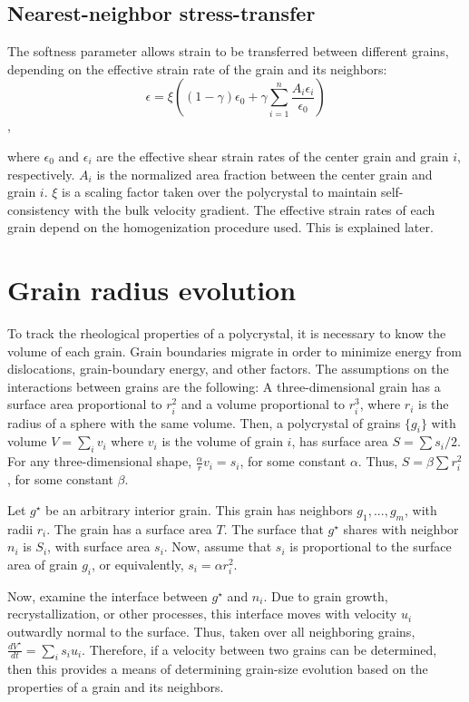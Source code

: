 \documentclass{igs}
\begin{document}
\subsection{Nearest-neighbor stress-transfer}
The softness parameter allows strain to be transferred between different grains, depending on the effective strain rate of the grain and its neighbors:
\begin{equation}
\epsilon = \xi \left( \left( 1 - \gamma \right)  \epsilon_0 + \gamma \sum_{i=1}^n \frac{A_i \epsilon_i}{\epsilon_0} \right)
\end{equation},

where $\epsilon_0$ and $\epsilon_i$ are the effective shear strain rates of the center grain and grain $i$, respectively. $A_i$ is the normalized area fraction between the center grain and grain $i$. $\xi$ is a scaling factor taken over the polycrystal to maintain self-consistency with the bulk velocity gradient. The effective strain rates of each grain depend on the homogenization procedure used. This is explained later.

\section{Grain radius evolution}
To track the rheological properties of a polycrystal, it is necessary to know the volume of each grain. Grain boundaries migrate in order to minimize energy from dislocations, grain-boundary energy, and other factors. The assumptions on the interactions between grains are the following: A three-dimensional grain has a surface area proportional to $r^2_i$ and a volume proportional to $r^3_i$, where $r_i$ is the radius of a sphere with the same volume. Then, a polycrystal of grains $\{g_i\}$ with volume $V=\sum_i v_i$ where $v_i$ is the volume of grain $i$, has surface area $S=\sum s_i/2$. For any three-dimensional shape, $\frac{\alpha}{r} v_i =  s_i$, for some constant $\alpha$. Thus, $S=\beta \sum r_i^2$, for some constant $\beta$.

Let $g^{\star}$ be an arbitrary interior grain. This grain has neighbors $g_1,...,g_m$, with radii $r_i$. The grain has a surface area $T$. The surface that $g^{\star}$ shares with neighbor $n_i$ is $S_i$, with surface area $s_i$. Now, assume that $s_i$ is proportional to the surface area of grain $g_i$, or equivalently, $s_i=\alpha r_i^2$.

Now, examine the interface between $g^{\star}$ and $n_i$. Due to grain growth, recrystallization, or other processes, this interface moves with velocity $u_i$ outwardly normal to the surface. Thus, taken over all neighboring grains, $\frac{dV^{\star}}{dt}=\sum_{i}s_i u_i$. Therefore, if a velocity between two grains can be determined, then this provides a means of determining grain-size evolution based on the properties of a grain and its neighbors.
\end{document}
